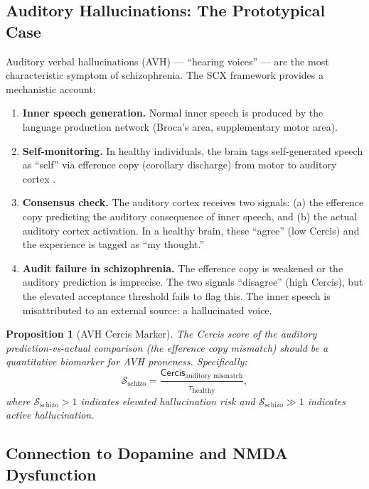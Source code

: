\documentclass[12pt,a4paper]{article}
\newtheorem{proposition}[theorem]{Proposition}
\theoremstyle{remark}
\newcommand{\Cercis}{\textsf{Cercis}}
\newcommand{\SchizoScore}{\mathcal{S}_{\text{schizo}}}
\begin{document}
\subsection{Auditory Hallucinations: The Prototypical Case}

Auditory verbal hallucinations (AVH) --- ``hearing voices'' --- are the most
characteristic symptom of schizophrenia. The SCX framework provides a
mechanistic account:

\begin{enumerate}[label=(\roman*)]
    \item \textbf{Inner speech generation.} Normal inner speech is produced by
          the language production network (Broca's area, supplementary motor area).
    \item \textbf{Self-monitoring.} In healthy individuals, the brain tags
          self-generated speech as ``self'' via efference copy (corollary discharge)
          from motor to auditory cortex \cite{feinberg1978efference}.
    \item \textbf{Consensus check.} The auditory cortex receives two signals:
          (a) the efference copy predicting the auditory consequence of inner speech,
          and (b) the actual auditory cortex activation. In a healthy brain, these
          ``agree'' (low \Cercis{}) and the experience is tagged as ``my thought.''
    \item \textbf{Audit failure in schizophrenia.} The efference copy is weakened
          or the auditory prediction is imprecise. The two signals ``disagree''
          (high \Cercis{}), but the elevated acceptance threshold fails to flag this.
          The inner speech is misattributed to an external source: a hallucinated voice.
\end{enumerate}

\begin{proposition}[AVH Cercis Marker]\label{prop:avh-marker}
The \Cercis{} score of the auditory prediction-vs-actual comparison (the
efference copy mismatch) should be a quantitative biomarker for AVH proneness.
Specifically:
\begin{equation}\label{eq:avh-cercis}
    \SchizoScore = \frac{\Cercis_{\text{auditory mismatch}}}{\tau_{\text{healthy}}},
\end{equation}
where $\SchizoScore > 1$ indicates elevated hallucination risk and
$\SchizoScore \gg 1$ indicates active hallucination.
\end{proposition}

\subsection{Connection to Dopamine and NMDA Dysfunction}
\end{document}
